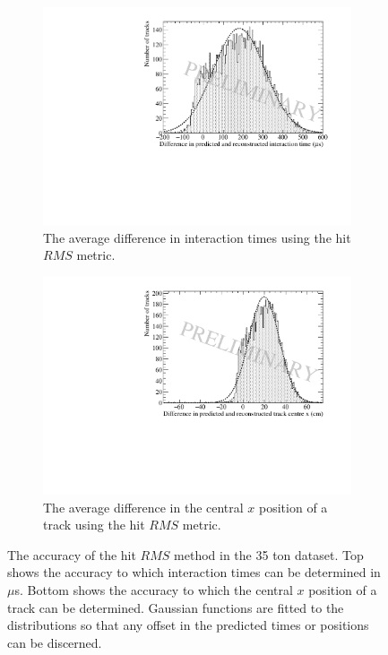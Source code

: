 \begin{figure}[h!]
  \centering
  \begin{subfigure}{0.6\textwidth}
    \centering
    \includegraphics[width=\textwidth]{Data_AvTimeDiff_RMS}
    \caption{The average difference in interaction times using the hit $RMS$ metric.}
    \label{fig:DiffDataAvDiff_RMS_T}
  \end{subfigure}

  \begin{subfigure}{0.6\textwidth}
    \centering
    \includegraphics[width=\textwidth]{Data_AvXPosDiff_RMS}
    \caption{The average difference in the central $x$ position of a track using the hit $RMS$ metric.}
    \label{fig:DiffDataAvDiff_RMS_X}
  \end{subfigure}
  \caption[The accuracy of the hit $RMS$ method in the 35 ton dataset]
          {The accuracy of the hit $RMS$ method in the 35 ton dataset. Top shows the accuracy to which interaction times can be determined in $\mu$s. Bottom shows the accuracy to which the central $x$ position of a track can be determined. Gaussian functions are fitted to the distributions so that any offset in the predicted times or positions can be discerned.}
  \label{fig:DiffDataAvDiff_RMS}
\end{figure}

